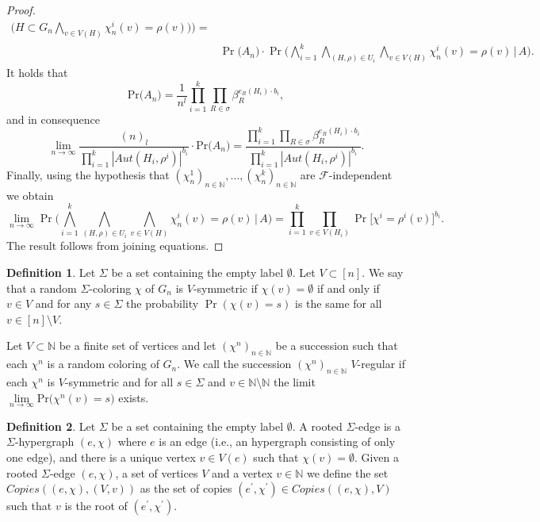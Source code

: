 \documentclass[12pt,notitlepage,a4paper]{article}
\theoremstyle{definition}
\newtheorem{definition}{Definition}[section]
\newcommand{\N}{\mathbb{N}}
\newcommand{\Ln}{\lim\limits_{n\to \infty}}
\newcommand{\PR}[1]{\mathrm{Pr}\big(#1\big)}
\begin{document}
\begin{proof}
\begin{align*}
	\big(H\subset G_n \bigwedge_{v\in V(H)} \chi_n^i(v)=\rho(v) \big) \Big)=\\
	&\Pr\big(A_n\big)\cdot \Pr\big(\bigwedge_{i=1}^k \bigwedge_{(H,\rho)\in U_i} 
	\bigwedge_{v\in V(H)} \chi^i_n(v)=\rho(v) \, \big| \, A \big).
	\end{align*}
	It holds that
	\[
	\PR{A_n}=\frac{1}{n^l} \prod_{i=1}^{k}\prod_{R\in \sigma} \beta_R^{e_R(H_i)\cdot b_i},
	\]
	and in consequence 
	\[
	\Ln \frac{(n)_l}{\prod_{i=1}^k |Aut(H_i,\rho^i)|^{b_i}}\cdot \PR{A_n}
	= \frac{\prod_{i=1}^{k}\prod_{R\in \sigma} \beta_R^{e_R(H_i)\cdot b_i}}
	{\prod_{i=1}^k |Aut(H_i,\rho^i)|^{b_i}}.
	\]
	Finally, using the hypothesis that 
	$(\chi^1_n)_{n\in\N}, \dots, (\chi^k_n)_{n\in\N}$
	are $\mathcal{F}$-independent we obtain
	\[
	\Ln \Pr\big(\bigwedge_{i=1}^k \bigwedge_{(H,\rho)\in U_i} 
	\bigwedge_{v\in V(H)} \chi^i_n(v)=\rho(v) \, \big| \, A \big)
	= \prod_{i=1}^{k} \prod_{v\in V(H_i)} \Pr\big[ \chi^i=\rho^i(v)\big]^{b_i}.
	\]
	The result follows from joining equations. 
\end{proof}

\begin{definition}
	Let $\Sigma$ be a set containing the empty label $\emptyset$.
	Let $V\subset [n]$. We say that a random $\Sigma$-coloring $\chi$
	of $G_n$ is $V$-symmetric if $\chi(v)=\emptyset$ if and only if $v\in V$ and
	for any $s\in \Sigma$ the probability $\Pr(\chi(v)=s)$ is the same for all 
	$v\in [n]\setminus V$. \par
	Let $V\subset \N$ be a finite set of vertices and let $(\chi^n)_{n\in \N}$
	be a succession such that each $\chi^n$ is a random coloring of $G_n$. We
	call the succession $(\chi^n)_{n\in \N}$ $V$-regular if each $\chi^n$ is
	$V$-symmetric and for all $s\in \Sigma$ and $v\in \N \setminus \N$ the limit 
	$\Ln \PR{\chi^n(v)=s}$ exists. 
\end{definition}

\begin{definition}
	Let $\Sigma$ be a set containing the empty label $\emptyset$. A rooted $\Sigma$-edge
	is a $\Sigma$-hypergraph $(e,\chi)$ where $e$ is an edge 
	(i.e., an hypergraph consisting of only one edge), and there is a unique vertex
	$v\in V(e)$ such that $\chi(v)=\emptyset$.
	Given a rooted $\Sigma$-edge $(e,\chi)$, a set of vertices $V$ and a vertex $v\in \N$
	we define the set $Copies((e,\chi),(V,v))$ as the set of copies 
	$(e^\prime, \chi^\prime) \in  Copies((e,\chi),V)$ such that $v$ is
	the root of $(e^\prime,\chi^\prime)$.
\end{definition}
\end{document}

